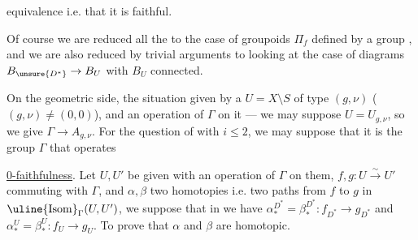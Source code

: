 
equivalence  i.e. that it is  faithful.

Of course we are reduced all the  to the case of groupoids  \(\Pi_f\) defined by a group , and we are also reduced by  trivial arguments to looking at the case of diagrams \(B_{\unsure{D^*}}\to B_U\) with \(B_U\) connected.

On the geometric side, the situation  given by a \(U=X\setminus S\) of type \((g,\nu)\) (\((g,\nu)\ne(0,0)\)), and an operation of \(\Gamma\) on it --- we may suppose \(U=U_{g,\nu}\), so we give \(\Gamma\to A_{g,\nu}\). For the question of  with \(i\leq 2\), we may suppose that it is the  group \(\Gamma\) that operates\unsure{;} 

 \uline{0-faithfulness}.  Let \(U,U'\) be given with an operation of \(\Gamma\) on them, \(f,g:U\stackrel{\sim}{\longrightarrow}U'\) commuting with \(\Gamma\), and \(\alpha,\beta\) two homotopies  i.e. two paths from \(f\) to \(g\) in \(\uline{\mathrm{Isom}}_\Gamma(U,U')\), we suppose that in 
we have \(\alpha_*^{D^*}=\beta_*^{D^*}:f_{D^*}\to g_{D^*}\) and \(\alpha_*^U=\beta_*^U:f_U\to g_U\). To prove that \(\alpha\) and \(\beta\) are homotopic.



